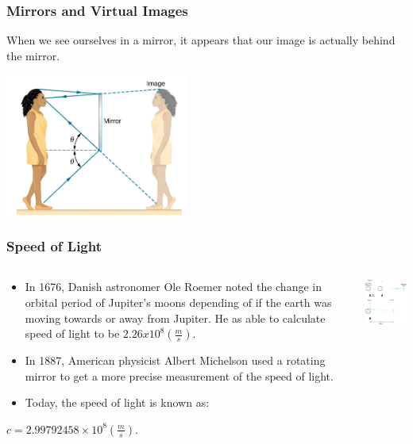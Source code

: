 \documentclass{beamer}
\begin{document}
\begin{frame}\frametitle{Mirrors and Virtual Images}
When we see ourselves in a mirror, it appears that our image is actually behind the mirror.

\begin{center}
\includegraphics[width=6cm]{fig/virtual.png}
\end{center}

\end{frame}

\begin{frame}\frametitle{Speed of Light}
\begin{columns}
\begin{column}{7cm}
\begin{itemize}
\item In 1676, Danish astronomer Ole Roemer noted the change in orbital period of Jupiter's moons depending of if the earth was moving towards or away from Jupiter. He as able to calculate speed of light to be $2.26 x 10^8 (\frac{m}{s})$.
\item In 1887, American physicist Albert Michelson used a rotating mirror to get a more precise measurement of the speed of light. 
\item Today, the speed of light is known as:
\end{itemize}
\begin{center}
$c=2.99792458×10^8 (\frac{m}{s})$.
\end{center}

\end{column}
\begin{column}{5cm}
\begin{center}
\includegraphics[width=4.5cm]{fig/c_meas.png}
\end{center}
\end{column}
\end{columns}
\end{frame}
\end{document}
